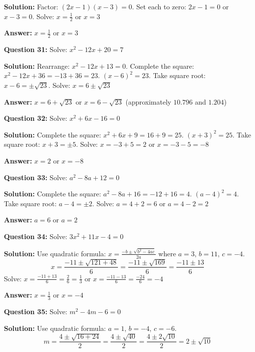 \documentclass[12pt]{article}
\begin{document}
\textbf{Solution:} Factor: $(2x - 1)(x - 3) = 0$. Set each to zero: $2x - 1 = 0$ or $x - 3 = 0$. Solve: $x = \frac{1}{2}$ or $x = 3$

\textbf{Answer:} $\boxed{x = \frac{1}{2} \text{ or } x = 3}$

\vspace{0.3cm}
\noindent
\textbf{Question 31:} Solve: $x^2 - 12x + 20 = 7$

\textbf{Solution:} Rearrange: $x^2 - 12x + 13 = 0$. Complete the square: $x^2 - 12x + 36 = -13 + 36 = 23$. $(x - 6)^2 = 23$. Take square root: $x - 6 = \pm\sqrt{23}$. Solve: $x = 6 \pm \sqrt{23}$

\textbf{Answer:} $\boxed{x = 6 + \sqrt{23} \text{ or } x = 6 - \sqrt{23}}$ (approximately $10.796$ and $1.204$)

\vspace{0.3cm}
\noindent
\textbf{Question 32:} Solve: $x^2 + 6x - 16 = 0$

\textbf{Solution:} Complete the square: $x^2 + 6x + 9 = 16 + 9 = 25$. $(x + 3)^2 = 25$. Take square root: $x + 3 = \pm 5$. Solve: $x = -3 + 5 = 2$ or $x = -3 - 5 = -8$

\textbf{Answer:} $\boxed{x = 2 \text{ or } x = -8}$

\vspace{0.3cm}
\noindent
\textbf{Question 33:} Solve: $a^2 - 8a + 12 = 0$

\textbf{Solution:} Complete the square: $a^2 - 8a + 16 = -12 + 16 = 4$. $(a - 4)^2 = 4$. Take square root: $a - 4 = \pm 2$. Solve: $a = 4 + 2 = 6$ or $a = 4 - 2 = 2$

\textbf{Answer:} $\boxed{a = 6 \text{ or } a = 2}$

\vspace{0.3cm}
\noindent
\textbf{Question 34:} Solve: $3x^2 + 11x - 4 = 0$

\textbf{Solution:} Use quadratic formula: $x = \frac{-b \pm \sqrt{b^2 - 4ac}}{2a}$ where $a = 3$, $b = 11$, $c = -4$.
\[x = \frac{-11 \pm \sqrt{121 + 48}}{6} = \frac{-11 \pm \sqrt{169}}{6} = \frac{-11 \pm 13}{6}\]
Solve: $x = \frac{-11 + 13}{6} = \frac{2}{6} = \frac{1}{3}$ or $x = \frac{-11 - 13}{6} = \frac{-24}{6} = -4$

\textbf{Answer:} $\boxed{x = \frac{1}{3} \text{ or } x = -4}$

\vspace{0.3cm}
\noindent
\textbf{Question 35:} Solve: $m^2 - 4m - 6 = 0$

\textbf{Solution:} Use quadratic formula: $a = 1$, $b = -4$, $c = -6$.
\[m = \frac{4 \pm \sqrt{16 + 24}}{2} = \frac{4 \pm \sqrt{40}}{2} = \frac{4 \pm 2\sqrt{10}}{2} = 2 \pm \sqrt{10}\]
\end{document}
